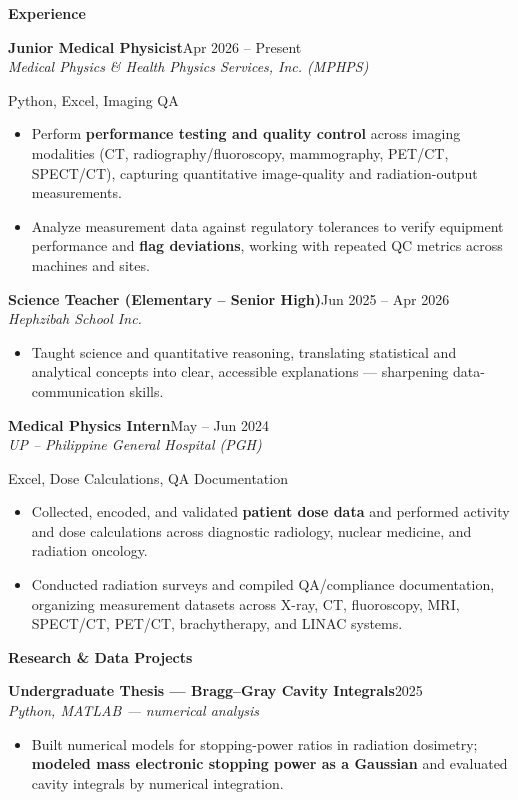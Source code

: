 \documentclass[10pt,letterpaper]{article}
\newcommand{\cvsec}[1]{%
  \vspace{7pt}%
  {\bfseries\large\color{accent}#1}\par
  \vspace{2pt}{\color{accent!55}\hrule height 0.7pt}\vspace{4pt}%
}
\newcommand{\entry}[3]{%
  \vspace{5pt}%
  {\bfseries #1}\hfill{\small\color{muted}#3}\\
  {\itshape #2}\par\vspace{1pt}%
}
\newcommand{\stack}[1]{{\footnotesize\color{muted}#1}\par\vspace{2pt}}
\newenvironment{cvbullets}
  {\begin{itemize}[leftmargin=1.15em,itemsep=1.5pt,topsep=2pt,parsep=0pt,
     label=\textcolor{accent}{\footnotesize$\bullet$}]}
  {\end{itemize}}
\begin{document}
\begin{minipage}[t]{0.64\textwidth}

\cvsec{Experience}

\entry{Junior Medical Physicist}{Medical Physics \& Health Physics Services, Inc. (MPHPS)}{Apr 2026 -- Present}
\stack{Python, Excel, Imaging QA}
\begin{cvbullets}
  \item Perform \textbf{performance testing and quality control} across
        imaging modalities (CT, radiography/fluoroscopy, mammography,
        PET/CT, SPECT/CT), capturing quantitative image-quality and
        radiation-output measurements.
  \item Analyze measurement data against regulatory tolerances to verify
        equipment performance and \textbf{flag deviations}, working with
        repeated QC metrics across machines and sites.
\end{cvbullets}

\entry{Science Teacher (Elementary -- Senior High)}{Hephzibah School Inc.}{Jun 2025 -- Apr 2026}
\begin{cvbullets}
  \item Taught science and quantitative reasoning, translating statistical
        and analytical concepts into clear, accessible explanations ---
        sharpening data-communication skills.
\end{cvbullets}

\entry{Medical Physics Intern}{UP -- Philippine General Hospital (PGH)}{May -- Jun 2024}
\stack{Excel, Dose Calculations, QA Documentation}
\begin{cvbullets}
  \item Collected, encoded, and validated \textbf{patient dose data} and
        performed activity and dose calculations across diagnostic
        radiology, nuclear medicine, and radiation oncology.
  \item Conducted radiation surveys and compiled QA/compliance
        documentation, organizing measurement datasets across X-ray, CT,
        fluoroscopy, MRI, SPECT/CT, PET/CT, brachytherapy, and LINAC systems.
\end{cvbullets}

\cvsec{Research \& Data Projects}

\entry{Undergraduate Thesis --- Bragg--Gray Cavity Integrals}{Python, MATLAB --- numerical analysis}{2025}
\begin{cvbullets}
  \item Built numerical models for stopping-power ratios in radiation
        dosimetry; \textbf{modeled mass electronic stopping power as a
        Gaussian} and evaluated cavity integrals by numerical integration.
\end{cvbullets}


\end{minipage}
\end{document}
